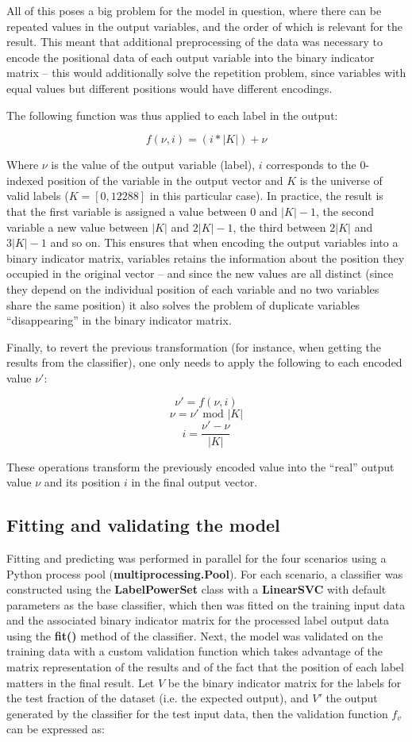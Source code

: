 \documentclass{kthreport}
\theoremstyle{definition}
\begin{document}
All of this poses a big problem for the model in question, where there can be repeated values in the output variables, and the order of which is relevant for the result. This meant that additional preprocessing of the data was necessary to encode the positional data of each output variable into the binary indicator matrix -- this would additionally solve the repetition problem, since variables with equal values but different positions would have different encodings.

The following function was thus applied to each label in the output:

\[ f(\nu, i) = (i * |K|) + \nu \]

Where $\nu$ is the value of the output variable (label), $i$ corresponds to the $0$-indexed position of the variable in the output vector and $K$ is the universe of valid labels ($K = [0, 12288]$ in this particular case). 
In practice, the result is that the first variable is assigned a value between $0$ and $|K| - 1$, the second variable a new value between $|K|$ and $2|K| - 1$, the third between $2|K|$ and $3|K| - 1$ and so on. 
This ensures that when encoding the output variables into a binary indicator matrix, variables retains the information about the position they occupied in the original vector -- and since the new values are all distinct (since they depend on the individual position of each variable and no two variables share the same position) it also solves the problem of duplicate variables ``disappearing'' in the binary indicator matrix.

Finally, to revert the previous transformation (for instance, when getting the results from the classifier), one only needs to apply the following to each encoded value $\nu'$:

\[ \nu' = f(\nu, i) \]
\[ \nu = \nu' \text{ mod } |K| \]
\[ i = \frac{\nu' - \nu}{|K|} \]

These operations transform the previously encoded value into the ``real'' output value $\nu$ and its position $i$ in the final output vector.

\subsection{Fitting and validating the model}

Fitting and predicting was performed in parallel for the four scenarios using a Python process pool (\textbf{multiprocessing.Pool}). For each scenario, a classifier was constructed using the \textbf{LabelPowerSet} class with a \textbf{LinearSVC} with default parameters as the base classifier, which then was fitted on the training input data and the associated binary indicator matrix for the processed label output data using the \textbf{fit()} method of the classifier.
Next, the model was validated on the training data with a custom validation function which takes advantage of the matrix representation of the results and of the fact that the position of each label matters in the final result. Let $V$ be the binary indicator matrix for the labels for the test fraction of the dataset (i.e. the expected output), and $V'$ the output generated by the classifier for the test input data, then the validation function $f_{v}$ can be expressed as:
\end{document}

